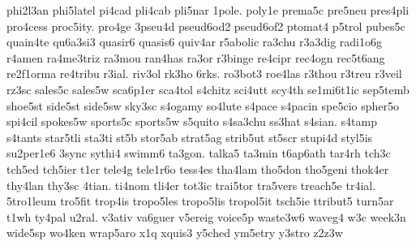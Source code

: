 phi2l3an
phi5latel
pi4cad
pli4cab
pli5nar
1pole.
poly1e
prema5c
pre5neu
pres4pli
pro4cess
proc5ity.
pro4ge
3pseu4d
pseud6od2
pseud6of2
ptomat4
p5trol
pubes5c
quain4te
qu6a3si3
quasir6
quasis6
quiv4ar
r5abolic
ra3chu
r3a3dig
radi1o6g
r4amen
ra4me3triz
ra3mou
ran4has
ra3or
r3binge
re4cipr
rec4ogn
rec5t6ang
re2f1orma
re4tribu
r3ial.
riv3ol
rk3ho
6rks.
ro3bot3
roe4las
r3thou
r3treu
r3veil
rz3sc
sales5c
sales5w
sca6p1er
sca4tol
s4chitz
sci4utt
scy4th
se1mi6t1ic
sep5temb
shoe5st
side5st
side5sw
sky3sc
s4ogamy
so4lute
s4pace
s4pacin
spe5cio
spher5o
spi4cil
spokes5w
sports5c
sports5w
s5quito
s4sa3chu
ss3hat
s4sian.
s4tamp
s4tants
star5tli
sta3ti
st5b
stor5ab
strat5ag
strib5ut
st5scr
stupi4d
styl5is
su2per1e6
3sync
sythi4
swimm6
ta3gon.
talka5
ta3min
t6ap6ath
tar4rh
tch3c
tch5ed
tch5ier
t1cr
tele4g
tele1r6o
tess4es
tha4lam
tho5don
tho5geni
thok4er
thy4lan
thy3sc
4tian.
ti4nom
tli4er
tot3ic
trai5tor
tra5vers
treach5e
tr4ial.
5tro1leum
tro5fit
trop4is
tropo5les
tropo5lis
tropol5it
tsch5ie
ttribut5
turn5ar
t1wh
ty4pal
u2ral.
v3ativ
va6guer
v5ereig
voice5p
waste3w6
waveg4
w3c
week3n
wide5sp
wo4ken
wrap5aro
x1q
xquis3
y5ched
ym5etry
y3stro
z2z3w
